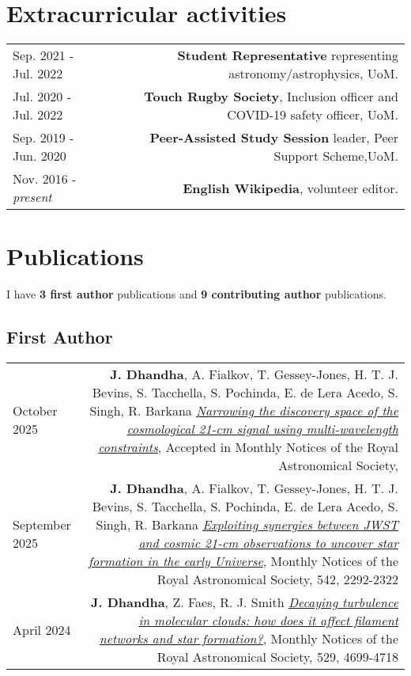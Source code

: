 \documentclass{article}
\begin{document}
\section*{Extracurricular activities}
\begin{longtable}{L!{\vrule}R}

  Sep. 2021 - Jul. 2022 & \textbf{Student Representative} representing astronomy/astrophysics, UoM. \\

  Jul. 2020 - Jul. 2022 & \textbf{Touch Rugby Society}, Inclusion officer and COVID-19 safety officer, UoM. \\

	Sep. 2019 - Jun. 2020 & \textbf{Peer-Assisted Study Session} leader, Peer Support Scheme,UoM. \\

	Nov. 2016 - \textit{present} & \textbf{English Wikipedia}, volunteer editor. \\
\end{longtable}

\newpage

\section*{Publications}

I have \textbf{3 first author} publications and \textbf{9 contributing author} publications.

\subsection*{First Author}

\begin{longtable}{L!{\vrule}R}
    October 2025 &
    \textbf{J. Dhandha}, A. Fialkov, T. Gessey-Jones, H. T. J. Bevins, S. Tacchella, S. Pochinda, E. de Lera Acedo, S. Singh, R. Barkana
    \href{https://ui.adsabs.harvard.edu/abs/2025arXiv250813761D}{\textit{Narrowing the discovery space of the cosmological 21-cm signal using multi-wavelength constraints}},
    Accepted in Monthly Notices of the Royal Astronomical Society,  \\

    September 2025 &
    \textbf{J. Dhandha}, A. Fialkov, T. Gessey-Jones, H. T. J. Bevins, S. Tacchella, S. Pochinda, E. de Lera Acedo, S. Singh, R. Barkana
    \href{https://ui.adsabs.harvard.edu/abs/2025MNRAS.542.2292D}{\textit{Exploiting synergies between JWST and cosmic 21-cm observations to uncover star formation in the early Universe}},
    Monthly Notices of the Royal Astronomical Society, 542, 2292-2322 \\

    April 2024 &
    \textbf{J. Dhandha}, Z. Faes, R. J. Smith
    \href{https://ui.adsabs.harvard.edu/abs/2024MNRAS.529.4699D}{\textit{Decaying turbulence in molecular clouds: how does it affect filament networks and star formation?}},
    Monthly Notices of the Royal Astronomical Society, 529, 4699-4718 \\
\end{longtable}
\end{document}
